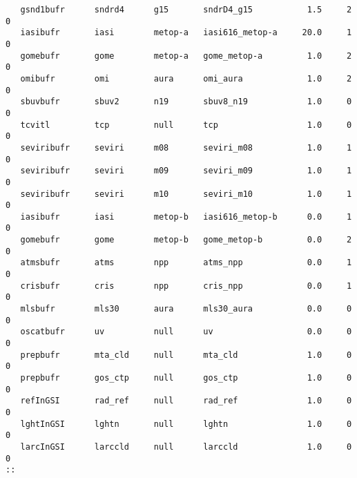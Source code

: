\begin{scriptsize}
\begin{verbatim}
   gsnd1bufr      sndrd4      g15       sndrD4_g15           1.5     2     0
   iasibufr       iasi        metop-a   iasi616_metop-a     20.0     1     0
   gomebufr       gome        metop-a   gome_metop-a         1.0     2     0
   omibufr        omi         aura      omi_aura             1.0     2     0
   sbuvbufr       sbuv2       n19       sbuv8_n19            1.0     0     0
   tcvitl         tcp         null      tcp                  1.0     0     0
   seviribufr     seviri      m08       seviri_m08           1.0     1     0
   seviribufr     seviri      m09       seviri_m09           1.0     1     0
   seviribufr     seviri      m10       seviri_m10           1.0     1     0
   iasibufr       iasi        metop-b   iasi616_metop-b      0.0     1     0
   gomebufr       gome        metop-b   gome_metop-b         0.0     2     0
   atmsbufr       atms        npp       atms_npp             0.0     1     0
   crisbufr       cris        npp       cris_npp             0.0     1     0
   mlsbufr        mls30       aura      mls30_aura           0.0     0     0
   oscatbufr      uv          null      uv                   0.0     0     0
   prepbufr       mta_cld     null      mta_cld              1.0     0     0
   prepbufr       gos_ctp     null      gos_ctp              1.0     0     0
   refInGSI       rad_ref     null      rad_ref              1.0     0     0
   lghtInGSI      lghtn       null      lghtn                1.0     0     0
   larcInGSI      larccld     null      larccld              1.0     0     0
::
\end{verbatim}
\end{scriptsize}
